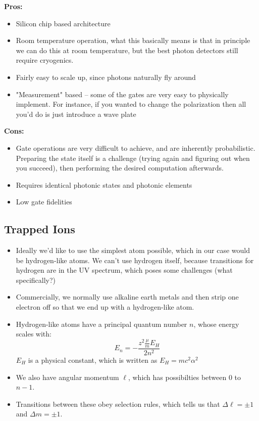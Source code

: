 \begin{itemize}
		\textbf{Pros:}
		\begin{itemize}
			\item Silicon chip based architecture
			\item Room temperature operation, what this basically means is that in principle we can do this 
				at room temperature, but the best photon detectors still require cryogenics. 
			\item Fairly easy to scale up, since photons naturally fly around
			\item "Measurement" based -- some of the gates are very easy to physically implement. For instance, 
				if you wanted to change the polarization then all you'd do is just introduce a wave plate
		\end{itemize}
		
		\textbf{Cons:}
		\begin{itemize}
			\item Gate operations are very difficult to achieve, and are inherently probabilistic. Preparing 
				the state itself is a challenge (trying again and figuring out when you succeed), then performing 
				the desired computation afterwards. 
			\item Requires identical photonic states and photonic elements
			\item Low gate fidelities
		\end{itemize}
\end{itemize}
\subsection{Trapped Ions}
\begin{itemize}
	\item Ideally we'd like to use the simplest atom possible, which in our case would be hydrogen-like 
		atoms. We can't use hydrogen itself, because transitions for hydrogen are in the UV spectrum, which poses 
		some challenges (what specifically?)
	\item Commercially, we normally use alkaline earth metals and then strip one electron off so that we end up with 
		a hydrogen-like atom. 
	\item Hydrogen-like atoms have a principal quantum number \( n \), whose energy scales with:
		\[
		E_n = -\frac{z^2 \frac{\mu}{m} E_H}{2n^2}
		\] 
		\( E_H \) is a physical constant, which is written as \( E_H = mc^2 \alpha^2 \)
	\item We also have angular momentum \( \ell \), which has possibilties between \( 0 \) to \( n - 1 \). 
	\item Transitions between these obey selection rules, which tells us that \( \Delta \ell = \pm 1 \) and 
		\( \Delta m = \pm 1 \). 
\end{itemize}
